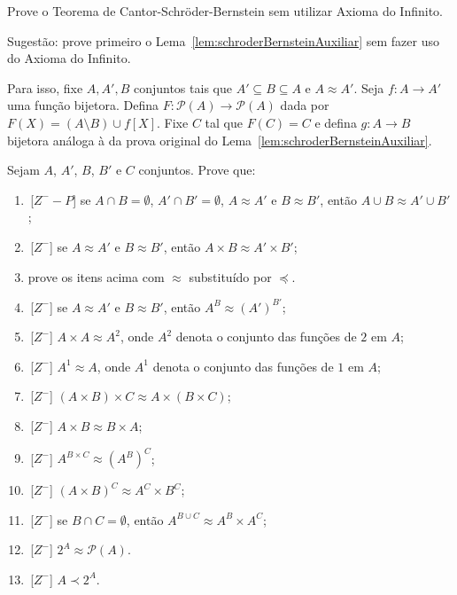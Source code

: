 \begin{exercise}[$Z^--I$]
Prove o Teorema de Cantor-Schröder-Bernstein sem utilizar Axioma do Infinito.

Sugestão: prove primeiro o Lema~\ref{lem:schroderBernsteinAuxiliar} sem fazer uso do Axioma do Infinito.

Para isso, fixe $A, A', B$ conjuntos tais que $A'\subseteq B\subseteq A$ e $A\approx A'$.
Seja $f: A\to A'$ uma função bijetora.
Defina $F:\mathcal P(A)\to \mathcal P(A)$ dada por $F(X) = (A\setminus B) \cup f[X]$.
Fixe $C$ tal que $F(C)=C$ e defina $g: A\to B$ bijetora análoga à da prova original do Lema~\ref{lem:schroderBernsteinAuxiliar}.
\end{exercise}
\begin{exercise}
    Sejam $A$, $A'$, $B$, $B'$ e $C$ conjuntos. Prove que:
    \begin{enumerate}[label=(\alph*)]
        \item \,[$Z^--P$] se $A\cap B=\emptyset$, $A'\cap B'=\emptyset$, $A\approx A'$ e $B\approx B'$, então $A\cup B \approx A'\cup B'$;

        \item \,[$Z^-$] se $A\approx A'$ e $B\approx B'$, então $A\times B \approx A'\times B'$;
        \item prove os itens acima com $\approx$ substituído por $\preceq$.
        \item \,[$Z^-$] se $A\approx A'$ e $B\approx B'$, então $A^B \approx (A')^{B'}$;


        \item \,[$Z^-$] $A\times A \approx A^2$, onde $A^2$ denota o conjunto das funções de $2$ em $A$;
        \item \,[$Z^-$] $A^1\approx A$, onde $A^1$ denota o conjunto das funções de $1$ em $A$;
        \item \,[$Z^-$] $(A\times B)\times C \approx A\times (B\times C)$;

        \item \,[$Z^-$] $A\times B \approx B\times A$;

        \item \,[$Z^-$] $A^{B\times C} \approx (A^B)^C$;

        \item \,[$Z^-$] $(A\times B)^C \approx A^C \times B^C$;

        \item \,[$Z^-$] se $B\cap C=\emptyset$, então $A^{B\cup C} \approx A^B \times A^C$;

        \item \,[$Z^-$] $2^A \approx \mathcal P(A)$.
        \item \,[$Z^-$] $A\prec 2^A$.
    \end{enumerate}
\end{exercise}
